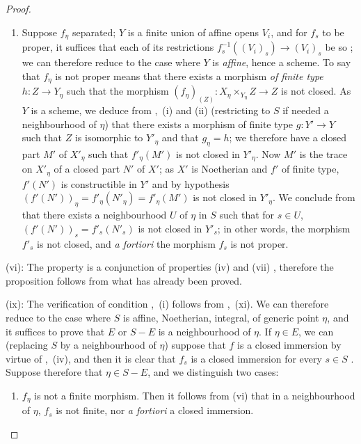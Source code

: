 \begin{proof}
\begin{enumerate}[label=\upshape{$\arabic{enumi}^\circ$}]
  \item Suppose $f_\eta$ separated; $Y$ is a finite union of affine opens $V_i$, and for $f_s$ to be proper, it suffices that each of its restrictions $f_s^{-1}((V_i)_s)\to(V_i)_s$ be so ; we can therefore reduce to the case where $Y$ is \emph{affine}, hence a scheme.
  To say that $f_\eta$ is not proper means  that there exists a morphism \emph{of finite type} $h:Z\to Y_\eta$ such that the morphism $(f_\eta)_{(Z)}:X_\eta\times_{Y_\eta} Z\to Z$ is not closed.
  As $Y$ is a scheme, we deduce from ,~(i) and (ii) (restricting to $S$ if needed a neighbourhood of $\eta$) that there exists a morphism of finite type $g:Y'\to Y$ such that $Z$ is isomorphic to $Y'_\eta$ and that $g_\eta=h$;
  we therefore have a closed part $M'$ of $X'_\eta$ such that $f'_\eta(M')$ is not closed in $Y'_\eta$.
  Now $M'$ is the trace on $X'_\eta$ of a closed part $N'$ of $X'$; as $X'$ is Noetherian and $f'$ of finite type, $f'(N')$ is constructible in $Y'$  and by hypothesis $(f'(N'))_\eta=f'_\eta(N'_\eta)=f'_\eta(M')$ is not closed in $Y'_\eta$.
  We conclude from  that there exists a neighbourhood $U$ of $\eta$ in $S$ such that for $s\in U$, $(f'(N'))_s=f'_s(N'_s)$ is not closed in $Y'_s$; in other words, the morphism $f'_s$ is not closed, and \emph{a fortiori} the morphism $f_s$ is not proper.
\end{enumerate}

(vi): The property is a conjunction of properties (iv) and (vii) , therefore the proposition follows from what has already been proved.

(ix): The verification of condition ,~(i) follows from ,~(xi).
We can therefore reduce to the case where $S$ is affine, Noetherian, integral, of generic point $\eta$, and it suffices to prove that $E$ or $S-E$ is a neighbourhood of $\eta$.
If $\eta\in E$, we can (replacing $S$ by a neighbourhood of $\eta$) suppose that $f$ is a closed immersion by virtue of ,~(iv), and then it is clear that $f_s$ is a closed immersion for every $s\in S$ .
Suppose therefore that $\eta\in S-E$, and we distinguish two cases:
\begin{enumerate}[label=\upshape{$\arabic{enumi}^\circ$}]
  \item $f_\eta$ is not a finite morphism.
  Then it follows from (vi) that in a neighbourhood of $\eta$, $f_s$ is not finite, nor \emph{a fortiori} a closed immersion.


\end{enumerate}
\end{proof}
